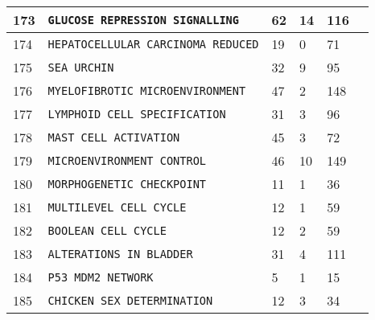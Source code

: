 \documentclass{article}
\begin{document}
\begin{center}
\begin{tabular}{ | C{16pt} | C{149pt} | C{25pt} | C{25pt} | C{25pt} | C{36pt} | }
	 	 & \texttt{GLUCOSE REPRESSION SIGNALLING} & 62 & 14 & 116 & \cite{bbm-048-173} \\
	 	 & \texttt{HEPATOCELLULAR CARCINOMA REDUCED} & 19 & 0 & 71 & \cite{bbm-092-174} \\
	 	 & \texttt{SEA URCHIN} & 32 & 9 & 95 & \cite{bbm-175} \\
	 	 & \texttt{MYELOFIBROTIC MICROENVIRONMENT} & 47 & 2 & 148 & \cite{bbm-176} \\
	 	 & \texttt{LYMPHOID CELL SPECIFICATION} & 31 & 3 & 96 & \cite{bbm-073-177} \\
	 	 & \texttt{MAST CELL ACTIVATION} & 45 & 3 & 72 & \cite{bbm-178} \\
	 	 & \texttt{MICROENVIRONMENT CONTROL} & 46 & 10 & 149 & \cite{bbm-179} \\
	 	 & \texttt{MORPHOGENETIC CHECKPOINT} & 11 & 1 & 36 & \cite{bbm-146-147-159-180} \\
	 	 & \texttt{MULTILEVEL CELL CYCLE} & 12 & 1 & 59 & \cite{bbm-181-182} \\
	 	 & \texttt{BOOLEAN CELL CYCLE} & 12 & 2 & 59 & \cite{bbm-181-182} \\
	 	 & \texttt{ALTERATIONS IN BLADDER} & 31 & 4 & 111 & \cite{bbm-183} \\
	 	 & \texttt{P53 MDM2 NETWORK} & 5 & 1 & 15 & \cite{bbm-184} \\
	 	 & \texttt{CHICKEN SEX DETERMINATION} & 12 & 3 & 34 & \cite{bbm-185-186} \\
	 	\hline	 	
	\end{tabular}


\end{center}
\end{document}
